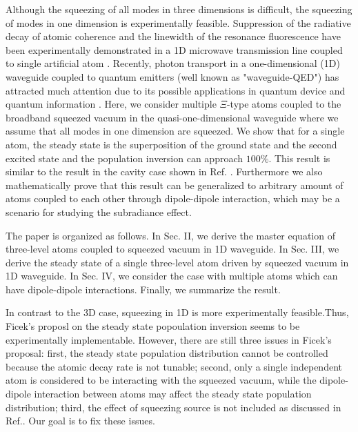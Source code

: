 \documentclass[aps,showpacs,twocolumn,twoside,groupedaddress]{revtex4}
\begin{document}
Although the squeezing of all modes in three dimensions is difficult, the squeezing of modes in one dimension is experimentally feasible.  Suppression of the radiative decay of atomic coherence and the linewidth of the resonance fluorescence have been experimentally demonstrated in a 1D microwave transmission line coupled to single artificial atom \cite{turchette1998qa, murch2013kw, toyli2016resonance, bergeal2010analog, wang2018cavity, qin2018exponentially}. Recently, photon transport in a one-dimensional (1D) waveguide coupled to quantum emitters (well known as "waveguide-QED") has attracted much attention due to
its possible applications in quantum device and quantum information \cite{shen2005coherent, shen2007strongly, yudson2008multiphoton, liao2015single, liao2016dynamical, liao2016review, roy2017review}. Here, we consider multiple $\Xi$-type atoms coupled to the broadband squeezed vacuum in the quasi-one-dimensional waveguide where we assume that all modes in one dimension are squeezed. We show that for a single atom, the steady state is the superposition of the ground state and the second excited state and the population inversion can approach $100\%$. This result is similar to the result in the cavity case shown in Ref. \cite{ficek1991three}. Furthermore we also mathematically prove that this result can be generalized to arbitrary amount of atoms coupled to each other through dipole-dipole interaction, which may be a scenario for studying the subradiance effect.

The paper is organized as follows. In Sec. II, we derive the master equation of three-level atoms coupled to squeezed vacuum in 1D waveguide. In Sec. III, we derive the steady state of a single three-level atom driven by squeezed vacuum in 1D waveguide. In Sec. IV, we consider the case with multiple atoms which can have dipole-dipole interactions. Finally, we summarize the result.


In contrast to the 3D case, squeezing in 1D is more experimentally feasible.Thus, Ficek's proposl on the steady state popoulation inversion seems to be experimentally implementable. However, there are still three issues in Ficek's proposal: first, the steady state population distribution cannot be controlled because the atomic decay rate is not tunable; second, only a single independent atom is considered to be interacting with the squeezed vacuum, while the dipole-dipole interaction between atoms may affect the steady state population distribution; third, the effect of squeezing source is not included as discussed in Ref.\cite{You2018}. Our goal is to fix these issues.  
\end{document}
